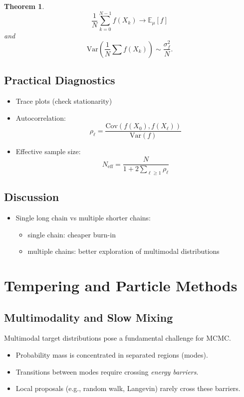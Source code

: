 \documentclass[12pt,oneside]{book}
\numberwithin{equation}{section}
\theoremstyle{definition}
\theoremstyle{plain}
\newtheorem{theorem}{Theorem}[section]
\theoremstyle{remark}
\newcommand{\E}{\mathbb{E}}
\newcommand{\Var}{\mathrm{Var}}
\begin{document}
\begin{theorem}
\[
\frac{1}{N}\sum_{k=0}^{N-1} f(X_k)
\to \E_\mu[f]
\]
and
\[
\Var\left(\frac{1}{N}\sum f(X_k)\right) \sim \frac{\sigma_f^2}{N}.
\]
\end{theorem}


\subsection{Practical Diagnostics}

\begin{itemize}
\item Trace plots (check stationarity)
\item Autocorrelation:
\[
\rho_\ell = \frac{\mathrm{Cov}(f(X_0), f(X_\ell))}{\Var(f)}
\]
\item Effective sample size:
\[
N_{\mathrm{eff}} = \frac{N}{1 + 2\sum_{\ell \ge 1} \rho_\ell}
\]
\end{itemize}


\subsection*{Discussion}

\begin{itemize}
\item Single long chain vs multiple shorter chains:
\begin{itemize}
\item single chain: cheaper burn-in
\item multiple chains: better exploration of multimodal distributions
\end{itemize}
\end{itemize}

\section{Tempering and Particle Methods}

\subsection{Multimodality and Slow Mixing}

Multimodal target distributions pose a fundamental challenge for MCMC.

\begin{itemize}
    \item Probability mass is concentrated in separated regions (modes).
    \item Transitions between modes require crossing \emph{energy barriers}.
    \item Local proposals (e.g., random walk, Langevin) rarely cross these barriers.
\end{itemize}
\end{document}
